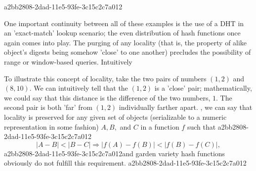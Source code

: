 \documentclass[12pt]{article}
\begin{document}
a2bb2808-2dad-11e5-93fe-3c15c2c7a012\par One important continuity between all of these examples is the use of a DHT in an 'exact-match' lookup scenario; the even distribution of hash functions once again comes into play. The purging of any locality (that is, the property of alike object's digests being somehow 'close' to one another) precludes the possibility of range or window-based queries. Intuitively

\par To illustrate this concept of locality, take the two pairs of numbers $(1,2)$ and $(8,10)$. We can intuitively tell that the $(1,2)$ is a 'close' pair; mathematically, we could say that this distance is the difference of the two numbers, $1$. The second pair is both 'far' from $(1,2)$ individually farther apart. , we can say that locality is preserved for any given set of objects (serializable to a numeric representation in some fashion) $A,B,$ and $C$ in a function $f$ such that
a2bb2808-2dad-11e5-93fe-3c15c2c7a012\begin{equation}
|A-B| < |B-C| \Rightarrow |f(A)-f(B)| < |f(B) - f(C)|,
\end{equation}
a2bb2808-2dad-11e5-93fe-3c15c2c7a012and garden variety hash functions obviously do not fulfill this requirement.
a2bb2808-2dad-11e5-93fe-3c15c2c7a012
\printbibliography
\end{document}
